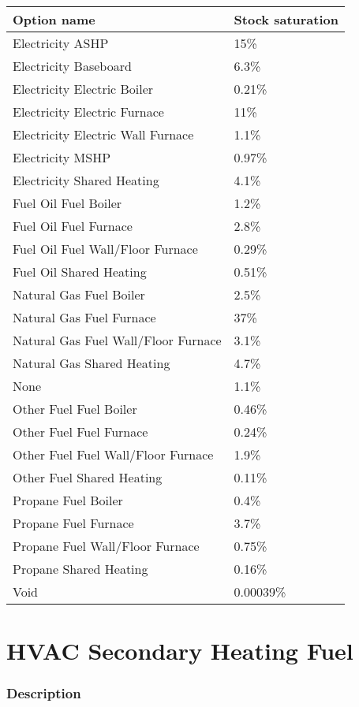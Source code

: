 \begin{longtable}[]{@{}ll@{}}
\toprule\noalign{}
Option name & Stock saturation \\
\midrule\noalign{}
\endhead
\bottomrule\noalign{}
\endlastfoot
Electricity ASHP & 15\% \\
Electricity Baseboard & 6.3\% \\
Electricity Electric Boiler & 0.21\% \\
Electricity Electric Furnace & 11\% \\
Electricity Electric Wall Furnace & 1.1\% \\
Electricity MSHP & 0.97\% \\
Electricity Shared Heating & 4.1\% \\
Fuel Oil Fuel Boiler & 1.2\% \\
Fuel Oil Fuel Furnace & 2.8\% \\
Fuel Oil Fuel Wall/Floor Furnace & 0.29\% \\
Fuel Oil Shared Heating & 0.51\% \\
Natural Gas Fuel Boiler & 2.5\% \\
Natural Gas Fuel Furnace & 37\% \\
Natural Gas Fuel Wall/Floor Furnace & 3.1\% \\
Natural Gas Shared Heating & 4.7\% \\
None & 1.1\% \\
Other Fuel Fuel Boiler & 0.46\% \\
Other Fuel Fuel Furnace & 0.24\% \\
Other Fuel Fuel Wall/Floor Furnace & 1.9\% \\
Other Fuel Shared Heating & 0.11\% \\
Propane Fuel Boiler & 0.4\% \\
Propane Fuel Furnace & 3.7\% \\
Propane Fuel Wall/Floor Furnace & 0.75\% \\
Propane Shared Heating & 0.16\% \\
Void & 0.00039\% \\
\end{longtable}


\section{HVAC Secondary Heating
Fuel}\label{hvac_secondary_heating_fuel}

\subsubsection{Description}\label{description-75}

